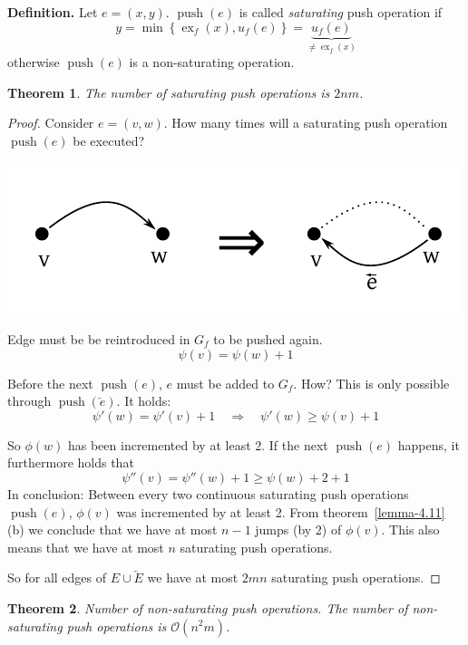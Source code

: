 \documentclass{article}
\newtheorem{theorem}{Theorem}
\newcommand{\set}[1]{\left\{#1\right\}}
\DeclareMathOperator{\push}{push}
\begin{document}
\textbf{Definition.}
  Let $e = (x, y)$. $\push(e)$ is called \emph{saturating} push operation if
  \[ y = \min\set{\operatorname{ex}_f(x), u_f(e)} = \underbrace{u_f(e)}_{\neq \operatorname{ex}_f(x)} \]
  otherwise $\push(e)$ is a non-saturating operation.

\begin{theorem}\label{lemma-4.12}
  The number of saturating push operations is $2nm$.
\end{theorem}

\begin{proof}
  Consider $e = (v, w)$. How many times will a saturating push operation $\push(e)$ be executed?

  \begin{center}
    \includegraphics{img/saturating_push.pdf}
  \end{center}

  Edge must be be reintroduced in $G_f$ to be pushed again.
  \[ \psi(v) = \psi(w) + 1 \]

  Before the next $\push(e)$, $e$ must be added to $G_f$.
  How? This is only possible through $\push(\overleftarrow{e})$. It holds:
  \[
    \psi'(w) = \psi'(v) + 1  \quad\Rightarrow\quad  \psi'(w) \geq \psi(v) + 1
  \]

  So $\phi(w)$ has been incremented by at least 2.
  If the next $\push(e)$ happens, it furthermore holds that
  \[
    \psi''(v) = \psi''(w) + 1 \geq \psi(w) + 2 + 1
  \]
  In conclusion: Between every two continuous saturating push operations $\push(e)$, $\phi(v)$ was incremented by at least 2.
  From theorem~\ref{lemma-4.11} (b) we conclude that we have at most $n-1$ jumps (by 2) of $\phi(v)$. This also means that we have at most $n$ saturating push operations.

  So for all edges of $E \cup \overleftarrow{E}$ we have at most $2mn$ saturating push operations.
\end{proof}

\begin{theorem}\label{lemma-4.13}
  \emph{Number of non-saturating push operations.}
  The number of non-saturating push operations is $\mathcal{O}(n^2m)$.
\end{theorem}
\end{document}
